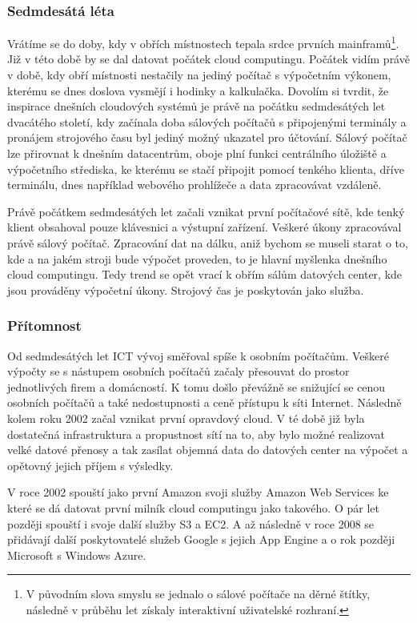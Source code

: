 \subsubsection{Sedmdesátá léta}
Vrátíme se do doby, kdy v obřích místnostech tepala srdce prvních mainframů\footnote{V původním slova smyslu se jednalo o sálové počítače na děrné štítky, následně v průběhu let získaly interaktivní uživatelské rozhraní.}. Již v této době by se dal datovat počátek cloud computingu. Počátek vidím právě v době, kdy obří místnosti nestačily na jediný počítač s výpočetním výkonem, kterému se dnes doslova vysmějí i hodinky a kalkulačka. Dovolím si tvrdit, že inspirace dnešních cloudových systémů je právě na počátku sedmdesátých let dvacátého století, kdy začínala doba sálových počítačů s připojenými terminály a pronájem strojového času byl jediný možný ukazatel pro účtování. Sálový počítač lze přirovnat k dnešním datacentrům, oboje plní funkci centrálního úložiště a výpočetního střediska, ke kterému se stačí připojit pomocí tenkého klienta, dříve terminálu, dnes například webového prohlížeče a data zpracovávat vzdáleně.

Právě počátkem sedmdesátých let začali vznikat první počítačové sítě, kde tenký klient obsahoval pouze klávesnici a výstupní zařízení. Veškeré úkony zpracovával právě sálový počítač. Zpracování dat na dálku, aniž bychom se museli starat o to, kde a na jakém stroji bude výpočet proveden, to je hlavní myšlenka dnešního cloud computingu. Tedy trend se opět vrací k obřím sálům datových center, kde jsou prováděny výpočetní úkony. Strojový čas je poskytován jako služba.

\subsubsection{Přítomnost}
Od sedmdesátých let ICT vývoj směřoval spíše k osobním počítačům. Veškeré výpočty se s nástupem osobních počítačů začaly přesouvat do prostor jednotlivých firem a domácností. K tomu došlo převážně se snižující se cenou osobních počítačů a také nedostupnosti a ceně přístupu k síti Internet. Následně kolem roku 2002 začal vznikat první opravdový cloud. V té době již byla dostatečná infrastruktura a propustnost sítí na to, aby bylo možné realizovat velké datové přenosy a tak zasílat objemná data do datových center na výpočet a opětovný jejich příjem s výsledky.

V roce 2002 spouští jako první Amazon svoji služby Amazon Web Services ke které se dá datovat první milník cloud computingu jako takového. O pár let později spouští i svoje další služby S3 a EC2. A až následně v roce 2008 se přidávají další poskytovatelé služeb Google s jejich App Engine a o rok později Microsoft s Windows Azure.


